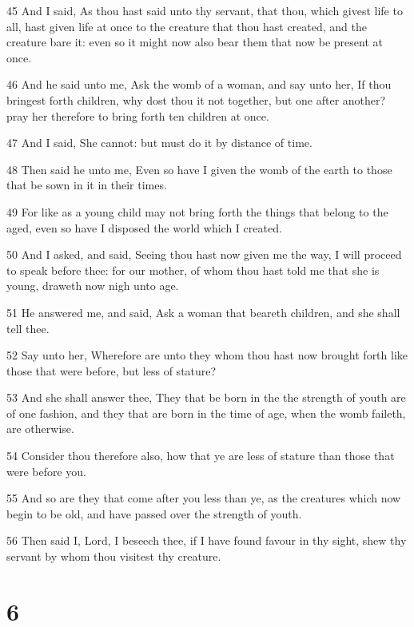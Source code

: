 \par 45 And I said, As thou hast said unto thy servant, that thou, which givest life to all, hast given life at once to the creature that thou hast created, and the creature bare it: even so it might now also bear them that now be present at once.
\par 46 And he said unto me, Ask the womb of a woman, and say unto her, If thou bringest forth children, why dost thou it not together, but one after another? pray her therefore to bring forth ten children at once.
\par 47 And I said, She cannot: but must do it by distance of time.
\par 48 Then said he unto me, Even so have I given the womb of the earth to those that be sown in it in their times.
\par 49 For like as a young child may not bring forth the things that belong to the aged, even so have I disposed the world which I created.
\par 50 And I asked, and said, Seeing thou hast now given me the way, I will proceed to speak before thee: for our mother, of whom thou hast told me that she is young, draweth now nigh unto age.
\par 51 He answered me, and said, Ask a woman that beareth children, and she shall tell thee.
\par 52 Say unto her, Wherefore are unto they whom thou hast now brought forth like those that were before, but less of stature?
\par 53 And she shall answer thee, They that be born in the the strength of youth are of one fashion, and they that are born in the time of age, when the womb faileth, are otherwise.
\par 54 Consider thou therefore also, how that ye are less of stature than those that were before you.
\par 55 And so are they that come after you less than ye, as the creatures which now begin to be old, and have passed over the strength of youth.
\par 56 Then said I, Lord, I beseech thee, if I have found favour in thy sight, shew thy servant by whom thou visitest thy creature.

\chapter{6}


